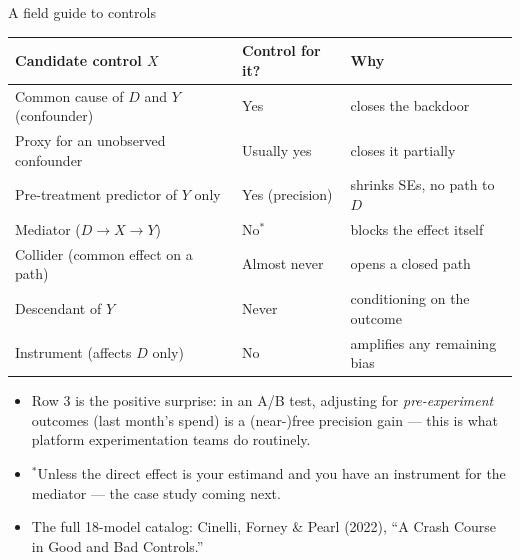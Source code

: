 \documentclass[aspectratio=169,11pt]{beamer}
\begin{document}
\begin{frame}{A field guide to controls}
\begin{center}
\small
\begin{tabular}{lll}
\hline
Candidate control $X$ & Control for it? & Why \\
\hline
Common cause of $D$ and $Y$ (confounder) & \alert{Yes} & closes the backdoor \\
Proxy for an unobserved confounder & Usually yes & closes it partially \\
Pre-treatment predictor of $Y$ only & Yes (\alert{precision}) & shrinks SEs, no path to $D$ \\
Mediator ($D \rightarrow X \rightarrow Y$) & No$^{*}$ & blocks the effect itself \\
Collider (common effect on a path) & \alert{Almost never} & opens a closed path \\
Descendant of $Y$ & \alert{Never} & conditioning on the outcome \\
Instrument (affects $D$ only) & No & \alert{amplifies} any remaining bias \\
\hline
\end{tabular}
\end{center}
\smallskip
\begin{itemize}
	\item Row 3 is the positive surprise: in an A/B test, adjusting for
	\emph{pre-experiment} outcomes (last month's spend) is a (near-)free precision gain ---
	this is what platform experimentation teams do routinely.
	\item $^{*}$Unless the \alert{direct} effect is your estimand and you have an
	instrument for the mediator --- the case study coming next.
	\item The full 18-model catalog: Cinelli, Forney \& Pearl (2022), ``A Crash
	Course in Good and Bad Controls.''
\end{itemize}
\end{frame}
\end{document}
